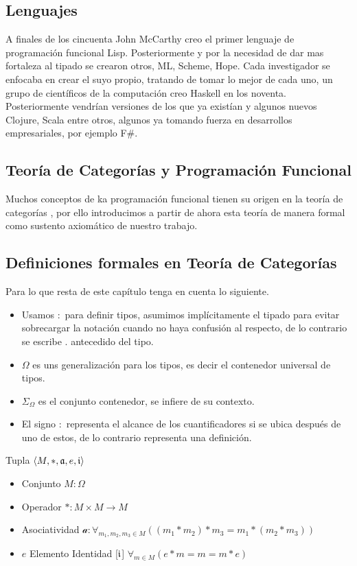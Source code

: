\subsection{Lenguajes}

A finales de los cincuenta John McCarthy creo el primer lenguaje de programación funcional Lisp. Posteriormente y por la necesidad de dar mas fortaleza al tipado se crearon otros, ML, Scheme, Hope. Cada investigador se enfocaba en crear el suyo propio, tratando de tomar lo mejor de cada uno, un grupo de científicos de la computación creo Haskell en los noventa. Posteriormente vendrían versiones de los que ya existían y algunos nuevos Clojure, Scala entre otros, algunos ya tomando fuerza en desarrollos empresariales, por ejemplo F\#.

\subsection{Teoría de Categorías y Programación Funcional}

Muchos conceptos de ka programación funcional tienen su origen en la teoría de categorías 
\cite{MacLane1978}, por ello introducimos a partir de ahora esta teoría de manera formal
\cite{Cornell} como sustento axiomático de nuestro trabajo.

\subsection{Definiciones formales en Teoría de Categorías}

Para lo que resta de este capítulo tenga en cuenta lo siguiente.
\begin{itemize}
\item Usamos $:$ para definir tipos, asumimos implícitamente el tipado para evitar sobrecargar la notación cuando no haya confusión al respecto, de lo contrario se escribe $.$ antecedido del tipo.
\item $\Omega$ es uns generalización para los tipos, es decir el contenedor universal de tipos.
\item $\Sigma_{\Omega}$ es el conjunto contenedor, se infiere de su contexto.
\item El signo $:$ representa el alcance de los cuantificadores si se ubica después de uno de estos, de lo contrario representa una definición.
\end{itemize}

\begin{defn}[Monoide]
\end{defn}
Tupla $\langle M, *, \mathfrak{a}, e, \mathfrak{i} \rangle$ 
\begin{itemize}
\item Conjunto $M: \Omega$
\item Operador $* : M \times M \to M$
\item Asociatividad $\mathcal{a} : \forall_{m_1, m_2, m_3 \in M} ((m_1 * m_2) * m_3 = m_1 * (m_2 * m_3))$
\item $e$ Elemento Identidad [$\mathfrak{i}$] $\forall_{m \in M} ( e * m = m = m * e)$
\end{itemize}

